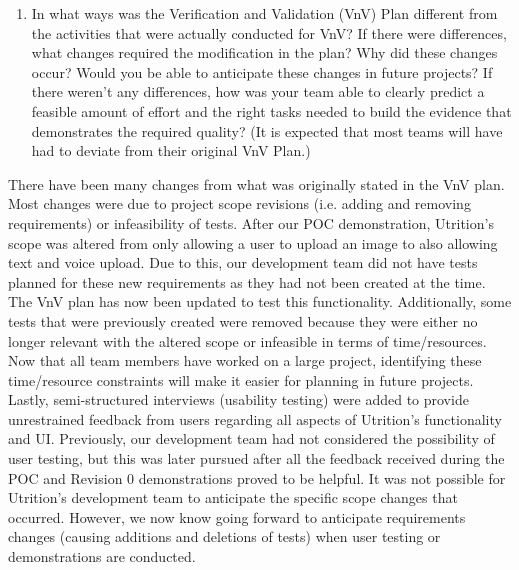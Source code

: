 \documentclass[12pt, titlepage]{article}
\begin{document}
	\begin{enumerate}
		\item In what ways was the Verification and Validation (VnV) Plan 
		different
		from the activities that were actually conducted for VnV?  If there were
		differences, what changes required the modification in the plan?  Why 
		did
		these changes occur?  Would you be able to anticipate these changes in 
		future
		projects?  If there weren't any differences, how was your team able to 
		clearly
		predict a feasible amount of effort and the right tasks needed to build 
		the
		evidence that demonstrates the required quality?  (It is expected that 
		most
		teams will have had to deviate from their original VnV Plan.)
	\end{enumerate}
	There have been many changes from what was originally stated in the VnV plan. Most changes were due to project scope revisions (i.e. adding and removing requirements) or infeasibility of tests. After our POC demonstration, Utrition's scope was altered from only allowing a user to upload an image to also allowing text and voice upload. Due to this, our development team did not have tests planned for these new requirements as they had not been created at the time. The VnV plan has now been updated to test this functionality. Additionally, some tests that were previously created were removed because they were either no longer relevant with the altered scope or infeasible in terms of time/resources. Now that all team members have worked on a large project, identifying these time/resource constraints will make it easier for planning in future projects. Lastly, semi-structured interviews (usability testing) were added to provide unrestrained feedback from users regarding all aspects of Utrition's functionality and UI. Previously, our development team had not considered the possibility of user testing, but this was later pursued after all the feedback received during the POC and Revision 0 demonstrations proved to be helpful. It was not possible for Utrition's development team to anticipate the specific scope changes that occurred. However, we now know going forward to anticipate requirements changes (causing additions and deletions of tests) when user testing or demonstrations are conducted. 

	
\end{document}
